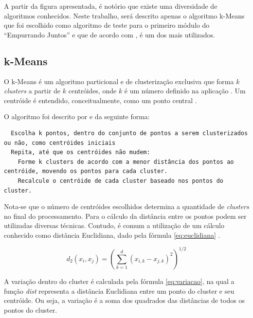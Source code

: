 A partir da figura apresentada, é notório que existe uma diversidade de algoritmos conhecidos. Neste trabalho, será descrito
apenas o algoritmo k-Means que foi escolhido como algoritmo de teste para o primeiro módulo do ``Empurrando Juntos'' e que de 
acordo com , é um dos mais utilizados.

\subsection{k-Means}
O k-Means é um algoritmo particional e de clusterização exclusiva que forma $k$ \textit{clusters} a partir de $k$ centróides, onde $k$ é um número definido na aplicação 
\cite{clustering_review, tan2013data}. Um centróide é entendido, conceitualmente, como um ponto central \cite{han2011data}.

O algoritmo foi descrito por  e  da seguinte forma:


\begin{center}
  \lstset{language=HTML, numbers=left, stepnumber=1}
  \begin{lstlisting}
  Escolha k pontos, dentro do conjunto de pontos a serem clusterizados ou não, como centróides iniciais
  Repita, até que os centróides não mudem:
    Forme k clusters de acordo com a menor distância dos pontos ao centróide, movendo os pontos para cada cluster.
    Recalcule o centróide de cada cluster baseado nos pontos do cluster.
  \end{lstlisting}
\end{center}


Nota-se que o número de centróides escolhidos determina a quantidade de \textit{clusters} no final do processamento.
Para o cálculo da distância entre os pontos podem ser utilizadas diversas técnicas. Contudo, é comum a utilização de um cálculo conhecido como distância Euclidiana, 
dado pela fórmula \ref{eq:euclidiana} \cite{clustering_review, tan2013data, han2011data}.

\begin{equation} \label{eq:euclidiana}
  d_{2}(x_i, x_j) = (\sum_{k=1}^{d} (x_{i,k} - x_{j,k})^2)^{1/2}
\end{equation}

A variação dentro do cluster é calculada pela fórmula \ref{eq:variacao}, na qual a 
função \textit{dist} representa a distância Euclidiana entre um ponto do
cluster e seu centróide. Ou seja, a variação é a soma dos quadrados
das distâncias de todos os pontos do cluster.

